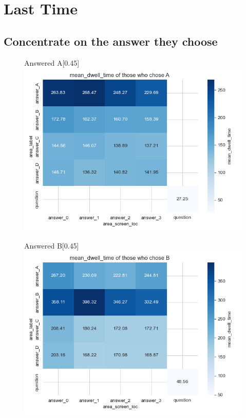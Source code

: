 \documentclass{article}
\begin{document}
\section{Last Time}

\subsection{Concentrate on the answer they choose}
\begin{figure}[H]
  \centering
  \begin{subcaptionbox}{Answered A\label{fig:A_dt_g}}[0.45\textwidth]
    {\centering\includegraphics[width=\linewidth]{plots/matrix_plots/matrix_mean_dwell_time_A_gatherers.png}}
  \end{subcaptionbox}
  \hfill
  \begin{subcaptionbox}{Answered B\label{fig:B_dt_g}}[0.45\textwidth]
    {\centering\includegraphics[width=\linewidth]{plots/matrix_plots/matrix_mean_dwell_time_B_gatherers.png}}
  \end{subcaptionbox}
    \vspace{1em} %
    

\end{figure}
\end{document}
